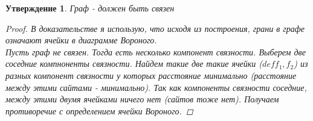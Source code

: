 \documentclass{article}
\theoremstyle{plain}
\newtheorem{statement}{Утверждение}[section]
\theoremstyle{definition}
\begin{document}
\begin{statement}
Граф - должен быть связен
\begin{proof}
В доказательстве я использую, что исходя из построения, грани в графе означают ячейки в диаграмме Вороного. \\ 
Пусть граф не связен. Тогда есть несколько компонент связности. Выберем две соседние компноненты связности. Найдем такие две такие ячейки ($def f_1, f_2$) из разных компонент связности у которых расстояние минимально (расстояние между этими сайтами - минимально). Так как компоненты связности соседние, между этими двумя ячейками ничего нет (сайтов тоже нет). Получаем противоречие с определением ячейки Вороного.    
\end{proof}
\end{statement}
\end{document}
